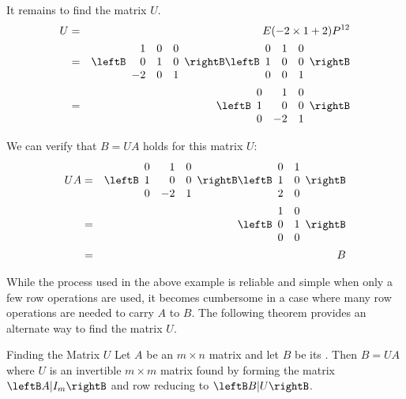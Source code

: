 \begin{solution}
It remains to find the matrix $U$. 
\begin{eqnarray*}
U &=& E(-2 \times 1 + 2) P^{12} \\
&=& \leftB \begin{array}{rrr}
1 & 0 & 0 \\
0 & 1 & 0 \\
-2 & 0 & 1 
\end{array} \rightB
\leftB \begin{array}{rrr}
0 & 1 & 0 \\
1 & 0 & 0 \\
0 & 0 & 1 
\end{array} \rightB \\
&=& \leftB
\begin{array}{rrr}
0 & 1 & 0\\
1 & 0 & 0 \\
0 & -2  & 1 
\end{array}
\rightB
\end{eqnarray*}

We can verify that $B = UA$ holds for this matrix $U$:
\begin{eqnarray*}
UA &=& \leftB
\begin{array}{rrr}
0 & 1 & 0\\
1 & 0 & 0 \\
0 & -2  & 1 
\end{array}
\rightB
\leftB
\begin{array}{rr}
0 & 1 \\
1 & 0 \\
2 & 0
\end{array}
\rightB \\
&=& \leftB \begin{array}{rr}
1 & 0 \\
0 & 1 \\
0 & 0 
\end{array} \rightB \\
&=& B 
\end{eqnarray*} 
\end{solution}

While the process used in the above example is reliable and simple when only a few row operations are used, it becomes cumbersome in a case where many row operations are needed to carry $A$ to $B$. The following theorem provides an alternate way to find the matrix $U$. 

\begin{theorem}{Finding the Matrix $U$}\label{thm:findingu}
Let $A$ be an $m \times n$ matrix and let $B$ be its \rref. Then $B = UA$ where $U$ is an invertible $m \times m$ matrix found by forming the matrix $ \leftB A | I_m \rightB$ and row reducing to $\leftB B | U \rightB$. 
\end{theorem}

